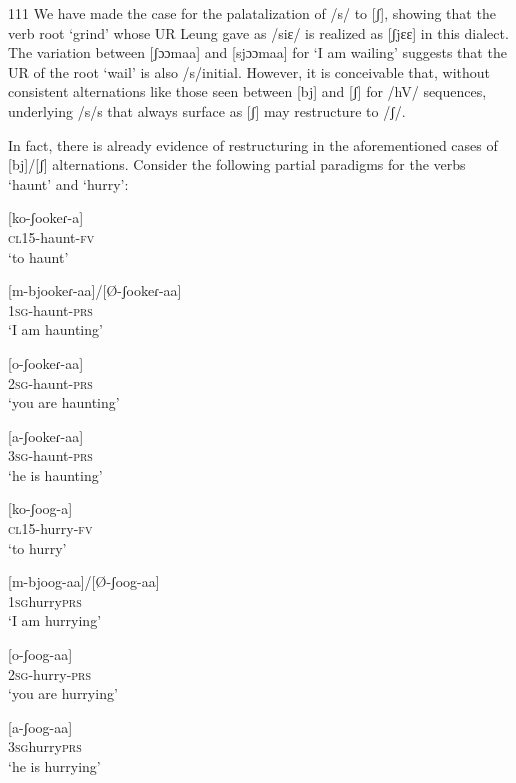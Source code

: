 \documentclass[output=paper]{langsci/langscibook}
\begin{document}
\begin{tabular}{111}
We have made the case for the palatalization of /s/ to [ʃ], showing that the verb root ‘grind’ whose UR Leung gave as /siɛ/ is realized as [ʃjɛɛ] in this dialect. The variation between [ʃɔɔmaa] and [sjɔɔmaa] for ‘I am wailing’ suggests that the UR of the root ‘wail’ is also /s/initial. However, it is conceivable that, without consistent alternations like those seen between [bj] and [ʃ] for /hV/ sequences, underlying /s/s that always surface as [ʃ] may restructure to /ʃ/. 

In fact, there is already evidence of restructuring in the aforementioned cases of [bj]/[ʃ] alternations. Consider the following partial paradigms for the verbs ‘haunt’ and ‘hurry’:


\ea\label{ex:glewwe:32}{}
   \ea\label{ex:glewwe:32a}
 [ko-ʃookeɾ-a]\\{}
\textsc{cl15}-haunt-\textsc{fv}\\{}
\glt ‘to haunt’

\ex\label{ex:glewwe:32b}{}
 [m-bjookeɾ-aa]/[Ø-ʃookeɾ-aa]\\{}
\textsc{1sg}-haunt-\textsc{prs}\\{}
\glt ‘I am haunting’


\ex\label{ex:glewwe:32c}{}
 [o-ʃookeɾ-aa]\\{}
\textsc{2sg}-haunt-\textsc{prs}\\{}
\glt ‘you are haunting’


\ex\label{ex:glewwe:32d}{}
 [a-ʃookeɾ-aa]\\{}
\textsc{3sg}-haunt-\textsc{prs}\\{}
\glt ‘he is haunting’

\ex\label{ex:glewwe:32e}{}
 [ko-ʃoog-a]\\{}
\textsc{cl15}-hurry-\textsc{fv}\\{}
\glt ‘to hurry’


\ex\label{ex:glewwe:32f}{}
 [m-bjoog-aa]/[Ø-ʃoog-aa]\\{}
\textsc{1sg}hurry\textsc{prs}\\{}
\glt ‘I am hurrying’

\ex\label{ex:glewwe:32g}{}
 [o-ʃoog-aa]\\{}
\textsc{2sg}-hurry-\textsc{prs}\\{}
\glt ‘you are hurrying’

\ea\label{ex:glewwe:32h}{}
 [a-ʃoog-aa]\\{}
\textsc{3sg}hurry\textsc{prs}\\{}
\glt ‘he is hurrying’
\z
\z 


\end{tabular}
\end{document}
